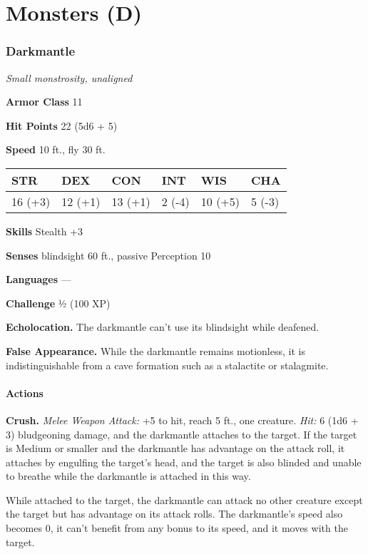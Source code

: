 \documentclass[
]{article}
\date{}
\begin{document}
\hypertarget{monsters-d}{%
\section{Monsters (D)}\label{monsters-d}}

\hypertarget{darkmantle}{%
\subsubsection{Darkmantle}\label{darkmantle}}

\emph{Small monstrosity, unaligned}

\textbf{Armor Class} 11

\textbf{Hit Points} 22 (5d6 + 5)

\textbf{Speed} 10 ft., fly 30 ft.

\begin{longtable}[]{@{}llllll@{}}
\toprule
STR & DEX & CON & INT & WIS & CHA\tabularnewline
\midrule
\endhead
16 (+3) & 12 (+1) & 13 (+1) & 2 (-4) & 10 (+5) & 5 (-3)\tabularnewline
\bottomrule
\end{longtable}

\textbf{Skills} Stealth +3

\textbf{Senses} blindsight 60 ft., passive Perception 10

\textbf{Languages} ---

\textbf{Challenge} ½ (100 XP)

\textbf{Echolocation.} The darkmantle can't use its blindsight while
deafened.

\textbf{False Appearance.} While the darkmantle remains motionless, it
is indistinguishable from a cave formation such as a stalactite or
stalagmite.

\hypertarget{actions}{%
\paragraph{Actions}\label{actions}}

\textbf{Crush.} \emph{Melee Weapon Attack:} +5 to hit, reach 5 ft., one
creature. \emph{Hit:} 6 (1d6 + 3) bludgeoning damage, and the darkmantle
attaches to the target. If the target is Medium or smaller and the
darkmantle has advantage on the attack roll, it attaches by engulfing
the target's head, and the target is also blinded and unable to breathe
while the darkmantle is attached in this way.

While attached to the target, the darkmantle can attack no other
creature except the target but has advantage on its attack rolls. The
darkmantle's speed also becomes 0, it can't benefit from any bonus to
its speed, and it moves with the target.
\end{document}

